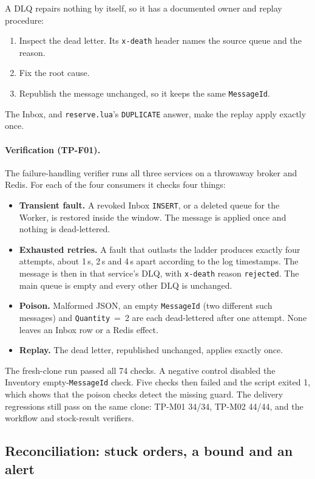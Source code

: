 \documentclass[a4paper]{report}
\begin{document}
A DLQ repairs nothing by itself, so it has a documented owner and replay
procedure:
\begin{enumerate}
  \item Inspect the dead letter. Its \texttt{x-death} header names the source
    queue and the reason.
  \item Fix the root cause.
  \item Republish the message unchanged, so it keeps the same
    \texttt{MessageId}.
\end{enumerate}
The Inbox, and \texttt{reserve.lua}'s \texttt{DUPLICATE} answer, make the
replay apply exactly once.

\paragraph{Verification (TP-F01).} The failure-handling verifier
runs all three services on a throwaway broker and Redis. For each of the four
consumers it checks four things:
\begin{itemize}
  \item \textbf{Transient fault.} A revoked Inbox \texttt{INSERT}, or a
    deleted queue for the Worker, is restored inside the window. The message
    is applied once and nothing is dead-lettered.
  \item \textbf{Exhausted retries.} A fault that outlasts the ladder produces
    exactly four attempts, about 1\,s, 2\,s and 4\,s apart according to the
    log timestamps. The message is then in that service's DLQ, with
    \texttt{x-death} reason \texttt{rejected}. The main queue is empty and
    every other DLQ is unchanged.
  \item \textbf{Poison.} Malformed JSON, an empty \texttt{MessageId} (two
    different such messages) and \texttt{Quantity}~=~2 are each
    dead-lettered after one attempt. None leaves an Inbox row or a Redis
    effect.
  \item \textbf{Replay.} The dead letter, republished unchanged, applies
    exactly once.
\end{itemize}

The fresh-clone run passed all 74 checks. A negative control disabled the
Inventory empty-\texttt{MessageId} check. Five checks then failed and the
script exited 1, which shows that the poison checks detect the missing guard.
The delivery regressions still pass on the same
clone: TP-M01 34/34, TP-M02 44/44, and the workflow and stock-result
verifiers.

\subsection{Reconciliation: stuck orders, a bound and an alert}
\label{sec:reconciliation}
\end{document}
